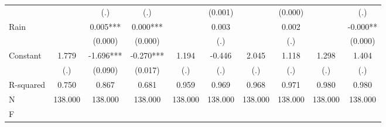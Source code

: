 {\begin{tabular}{l*{9}{c}}
                    &               &         (.)   &         (.)   &               &     (0.001)   &               &     (0.000)   &               &         (.)   \\
Rain                &               &       0.005***&       0.000***&               &       0.003   &               &       0.002   &               &      -0.000** \\
                    &               &     (0.000)   &     (0.000)   &               &         (.)   &               &         (.)   &               &     (0.000)   \\
Constant            &       1.779   &      -1.696***&      -0.270***&       1.194   &      -0.446   &       2.045   &       1.118   &       1.298   &       1.404   \\
                    &         (.)   &     (0.090)   &     (0.017)   &         (.)   &         (.)   &         (.)   &         (.)   &         (.)   &         (.)   \\
\hline
R-squared           &       0.750   &       0.867   &       0.681   &       0.959   &       0.969   &       0.968   &       0.971   &       0.980   &       0.980   \\
N                   &     138.000   &     138.000   &     138.000   &     138.000   &     138.000   &     138.000   &     138.000   &     138.000   &     138.000   \\
F                   &               &               &               &               &               &               &               &               &               \\
\hline\hline
\end{tabular}
}
